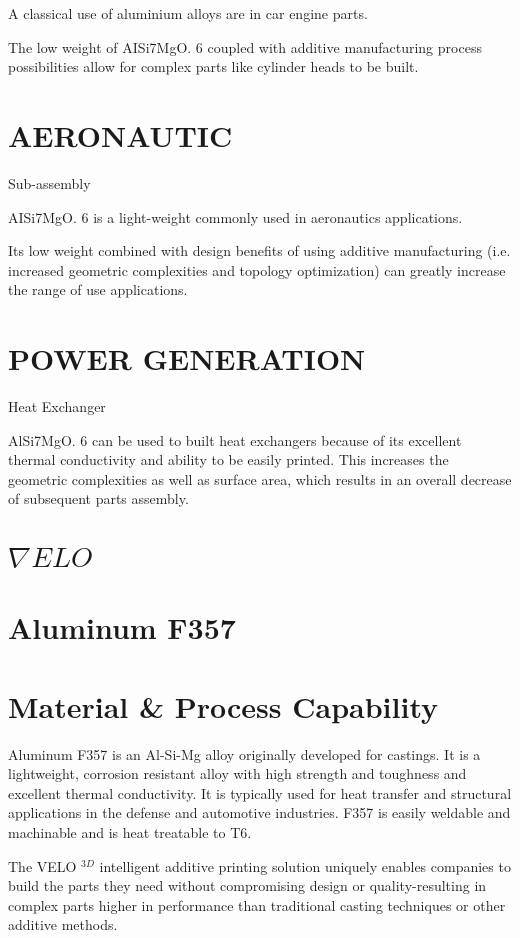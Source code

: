 \documentclass[10pt]{article}
\begin{document}
A classical use of aluminium alloys are in car engine parts.

The low weight of AISi7MgO. 6 coupled with additive manufacturing process possibilities allow for complex parts like cylinder heads to be built.

\section*{AERONAUTIC}
Sub-assembly

AISi7MgO. 6 is a light-weight commonly used in aeronautics applications.

Its low weight combined with design benefits of using additive manufacturing (i.e. increased geometric complexities and topology optimization) can greatly increase the range of use applications.

\section*{POWER GENERATION}
Heat Exchanger

AlSi7MgO. 6 can be used to built heat exchangers because of its excellent thermal conductivity and ability to be easily printed. This increases the geometric complexities as well as surface area, which results in an overall decrease of subsequent parts assembly.

\section*{$\nabla E L O$}
\section*{Aluminum F357}
\section*{Material \& Process Capability}
Aluminum F357 is an Al-Si-Mg alloy originally developed for castings. It is a lightweight, corrosion resistant alloy with high strength and toughness and excellent thermal conductivity. It is typically used for heat transfer and structural applications in the defense and automotive industries. F357 is easily weldable and machinable and is heat treatable to T6.

The VELO ${ }^{3 D}$ intelligent additive printing solution uniquely enables companies to build the parts they need without compromising design or quality-resulting in complex parts higher in performance than traditional casting techniques or other additive methods.
\end{document}
